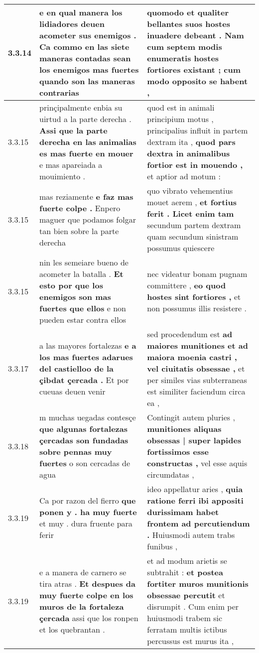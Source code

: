 \begin{tabular}{|p{1cm}|p{6.5cm}|p{6.5cm}|}
3.3.14 & e en qual manera los lidiadores deuen acometer sus enemigos . \textbf{ Ca commo en las siete maneras contadas sean los enemigos mas fuertes } quando son las maneras contrarias & quomodo et qualiter bellantes suos hostes inuadere debeant . \textbf{ Nam cum septem modis enumeratis hostes fortiores existant ; } cum modo opposito se habent , \\\hline
3.3.15 & prinçipalmente enbia su uirtud a la parte derecha . \textbf{ Assi que la parte derecha en las animalias es mas fuerte en mouer } e mas apareiada a mouimiento . & quod est in animali principium motus , principalius influit in partem dextram ita , \textbf{ quod pars dextra in animalibus fortior est in mouendo , } et aptior ad motum : \\\hline
3.3.15 & mas reziamente \textbf{ e faz mas fuerte colpe . } Enpero maguer que podamos folgar tan bien sobre la parte derecha & quo vibrato vehementius mouet aerem , \textbf{ et fortius ferit . Licet enim tam } secundum partem dextram quam secundum sinistram possumus quiescere \\\hline
3.3.15 & nin les semeiare bueno de acometer la batalla . \textbf{ Et esto por que los enemigos son mas fuertes que ellos } e non pueden estar contra ellos & nec videatur bonam pugnam committere , \textbf{ eo quod hostes sint fortiores , } et non possumus illis resistere . \\\hline
3.3.17 & a las mayores fortalezas \textbf{ e a los mas fuertes adarues del castielloo de la çibdat çercada . } Et por cueuas deuen venir & sed procedendum est \textbf{ ad maiores munitiones et ad maiora moenia castri , vel ciuitatis obsessae , } et per similes vias subterraneas est similiter faciendum circa ea , \\\hline
3.3.18 & m muchas uegadas contesçe \textbf{ que algunas fortalezas çercadas son fundadas sobre pennas muy fuertes } o son cercadas de agua & Contingit autem pluries , \textbf{ munitiones aliquas obsessas | super lapides fortissimos esse constructas , } vel esse aquis circumdatas , \\\hline
3.3.19 & Ca por razon del fierro \textbf{ que ponen y . ha muy fuerte } et muy . dura fruente para ferir & ideo appellatur aries , \textbf{ quia ratione ferri ibi appositi durissimam habet frontem ad percutiendum . } Huiusmodi autem trabs funibus , \\\hline
3.3.19 & e a manera de carnero se tira atras . \textbf{ Et despues da muy fuerte colpe en los muros de la fortaleza çercada } assi que los ronpen et los quebrantan . & et ad modum arietis se subtrahit : \textbf{ et postea fortiter muros munitionis obsessae percutit } et disrumpit . Cum enim per huiusmodi trabem sic ferratam multis ictibus percussus est murus ita , \\\hline

\end{tabular}
